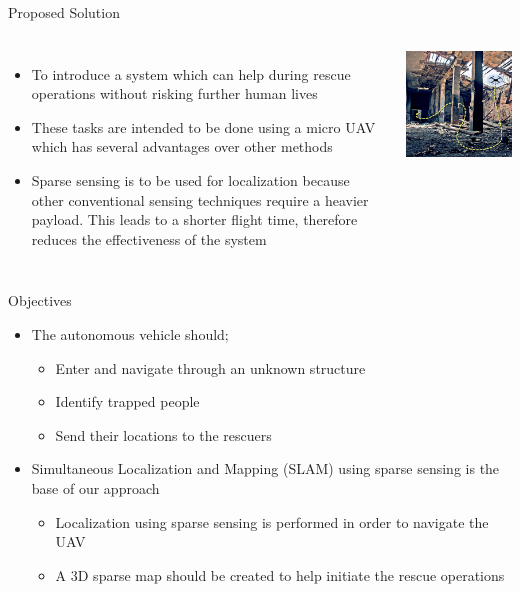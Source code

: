 \documentclass[xcolor=table]{beamer}
\begin{document}
\begin{frame}{Proposed Solution}
  \begin{columns}
  \begin{itemize}
  \item To introduce a system which can help during rescue operations without risking further human lives
  \item These tasks are intended to be done using a micro UAV which has several advantages over other methods  
  \item Sparse sensing is to be used for localization because other conventional sensing techniques require a heavier payload. This leads to a shorter flight time, therefore reduces the effectiveness of the system
  \end{itemize}
  \begin{center}
  \includegraphics[scale=0.6]{Drone_Mobility.jpg}
  \end{center}
  \end{columns}
\end{frame}

\begin{frame}{Objectives}
  \begin{itemize}
  \item The autonomous vehicle should;
    \begin{itemize}
  	\item Enter and navigate through an unknown structure
  	\item Identify trapped people
  	\item Send their locations to the rescuers
  	\end{itemize}
  \item Simultaneous Localization and Mapping (SLAM) using sparse sensing is the base of our approach
    \begin{itemize}
  	\item Localization using sparse sensing is performed in order to navigate the UAV
  	\item A 3D sparse map should be created to help initiate the rescue operations
  	\end{itemize}
  \end{itemize}
\end{frame}
\end{document}
